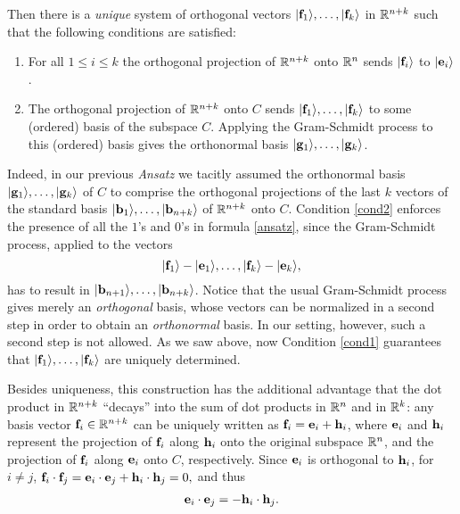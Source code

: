 \documentclass[%
 preprint,
 showpacs,
 showkeys,
 preprintnumbers,
 amsmath,amssymb,
 aps,
  pra,
  longbibliography,
 ]{revtex4-1}
\begin{document}
Then there is a {\em unique} system
of orthogonal vectors $\vert{\bf f}_1\rangle, \ldots,\vert{\bf f}_{k}\rangle$
in ${\Bbb R}^{n+k}$ such that the following conditions are satisfied:
\begin{enumerate}
  \item\label{cond1} For all $1\leq i\leq k$ the orthogonal projection of
      ${\Bbb R}^{n+k}$ onto ${\Bbb R}^{n}$ sends $\vert{\bf f}_i\rangle$ to
      $\vert{\bf e}_{i}\rangle$.


  \item\label{cond2} The orthogonal projection of ${\Bbb R}^{n+k}$ onto $C$
      sends $\vert{\bf f}_1\rangle,\ldots,\vert{\bf f}_k\rangle$ to some
      (ordered) basis of the subspace $C$. Applying the Gram-Schmidt
      process to this (ordered) basis gives the orthonormal basis
      $\vert{\bf g}_{1}\rangle,\ldots,\vert{\bf g}_{k}\rangle$.
\end{enumerate}

Indeed, in our previous \emph{Ansatz} we tacitly assumed the orthonormal basis
$\vert{\bf g}_{1}\rangle, \ldots,\vert{\bf g}_{k}\rangle$
of $C$ to comprise the orthogonal projections of
the last $k$ vectors of the standard basis
$\vert{\bf b}_1\rangle,\ldots,\vert{\bf b}_{n+k}\rangle$ of ${\Bbb R}^{n+k}$ onto $C$.
Condition
\ref{cond2} enforces the presence of
all the $1$'s and $0$'s in formula \eqref{ansatz}, since
the Gram-Schmidt process, applied to the vectors
\begin{equation*}
    \vert{\bf f}_1\rangle-\vert{\bf e}_1\rangle,\ldots,\vert{\bf f}_k\rangle-\vert{\bf e}_k\rangle
,
\end{equation*}
has to result in
$\vert{\bf b}_{n+1}\rangle,\ldots,\vert{\bf b}_{n+k}\rangle$.
Notice that the usual Gram-Schmidt process gives merely an \emph{orthogonal\/}
basis, whose vectors can be normalized in a second step in order to obtain an
\emph{orthonormal\/} basis. In our setting, however, such a second step is not
allowed. As we saw above, now Condition \ref{cond1} guarantees that
$\vert{\bf f}_1\rangle, \ldots,\vert{\bf f}_{k}\rangle$
are uniquely determined.


Besides uniqueness, this construction has the additional advantage
that the dot product in ${\Bbb R}^{n+k}$ ``decays''
into the sum of dot products in ${\Bbb R}^{n}$
and in ${\Bbb R}^{k}$:
any basis vector ${\bf f}_i \in {\Bbb R}^{n+k}$
can be uniquely written as  ${\bf f}_i = {\bf e}_i + {\bf h}_i$,
where ${\bf e}_i$ and ${\bf h}_i$
represent
the projection of ${\bf f}_i$ along ${\bf h}_i$ onto the original subspace ${\Bbb R}^{n}$,
and
the projection of ${\bf f}_i$ along ${\bf e}_i$ onto $C$,
respectively.
Since ${\bf e}_i$ is orthogonal to ${\bf h}_i$,
for $i\neq j$,
$
{\bf f}_i \cdot {\bf f}_j
=   {\bf e}_i \cdot {\bf e}_j + {\bf h}_i \cdot  {\bf h}_j = 0,
$
and thus
\begin{equation}
\begin{aligned}
{\bf e}_i \cdot {\bf e}_j = -{\bf h}_i \cdot  {\bf h}_j
.
\end{aligned}
\end{equation}
\end{document}

